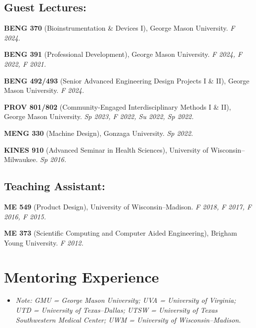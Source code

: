 \documentclass[letterpaper, 10pt]{article}
\begin{document}
\subsection{Guest Lectures:}
\begin{compactitem}
     \item \textbf{BENG 370} (Bioinstrumentation \& Devices I), George Mason University. \textit{F 2024.}
     \item \textbf{BENG 391} (Professional Development), George Mason University. \textit{F 2024, F 2022, F 2021.}
     \item \textbf{BENG 492/493} (Senior Advanced Engineering Design Projects I \& II), George Mason University. \textit{F 2024.}
     \item \textbf{PROV 801/802} (Community-Engaged Interdisciplinary Methods I \& II), George Mason University. \textit{Sp 2023, F 2022, Su 2022, Sp 2022.}
     \item \textbf{MENG 330} (Machine Design), Gonzaga University. \textit{Sp 2022.}
     \item \textbf{KINES 910 }(Advanced Seminar in Health Sciences), University of Wisconsin--Milwaukee. \textit{Sp 2016.}
\end{compactitem}


\subsection{Teaching Assistant:}
\begin{compactitem}
     \item \textbf{ME 549 }(Product Design), University of Wisconsin--Madison. \textit{F 2018, F 2017, F 2016, F 2015.}
     \item \textbf{ME 373 }(Scientific Computing and Computer Aided Engineering), Brigham Young University. \textit{F 2012.}
\end{compactitem}
     

\section{Mentoring Experience}

\begin{itemize}
	\item[] \textit{\footnotesize Note: GMU = George Mason University; UVA = University of Virginia; UTD = University of Texas--Dallas; UTSW = University of Texas Southwestern Medical Center; UWM = University of Wisconsin--Madison.}
\end{itemize}
\end{document}

